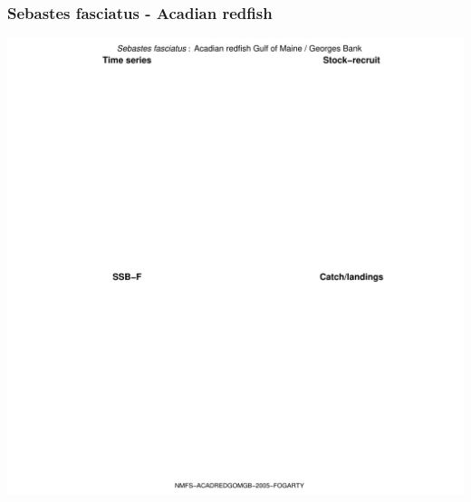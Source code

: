 \subsubsection{Sebastes fasciatus - Acadian redfish}
\begin{center}
\includegraphics[width=1.2\textwidth]{../R/figures/NMFS-ACADREDGOMGB-2005-FOGARTY.pdf}
\end{center}

